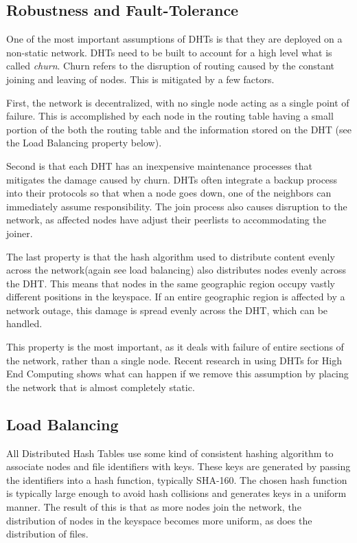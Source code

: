 \documentclass[10pt,letterpaper,twoside]{report}
\begin{document}
\subsection{Robustness and Fault-Tolerance}
\label{subsec:ft}
One of the most important assumptions of DHTs is that they are deployed on a non-static network.
DHTs need to be built to account for a high level what is called \textit{churn}.  
Churn refers to the disruption of routing caused by the constant joining and leaving of nodes.
This is mitigated by a few factors.

First, the network is decentralized, with no single node acting as a single point of failure.
This is accomplished by each node in the routing table having a small portion of the both the routing table and the information stored on the DHT (see the Load Balancing property below).

Second is that each DHT has an inexpensive maintenance processes that mitigates the damage caused by churn.
DHTs often integrate a backup process into their protocols so that when a node goes down, one of the neighbors can immediately assume responsibility.
The join process also causes disruption to the network, as affected nodes have adjust their peerlists to accommodating the joiner. 

The last property is that the hash algorithm used to distribute content evenly across the network(again see load balancing) also distributes nodes evenly across the DHT.  
This means that nodes in the same geographic region occupy vastly different positions in the keyspace.  
If an entire geographic region is affected by a network outage, this damage is spread evenly across the DHT, which can be handled.

This property is the most important, as it deals with failure of entire sections of the network, rather than a single node.
Recent research in using DHTs for High End Computing \cite{li2013zht} shows what can happen if we remove this assumption by placing the network that is almost completely static.



\subsection{Load Balancing}
\label{subsec:lb}
All Distributed Hash Tables use some kind of consistent hashing algorithm to associate nodes and file identifiers with keys.  
These keys are generated by passing the identifiers into a hash function, typically SHA-160.
The chosen hash function is typically large enough to avoid hash collisions and generates keys in a uniform manner. 
The result of this is that as more nodes join the network, the distribution of nodes in the keyspace becomes more uniform, as does the distribution of files.
\end{document}
